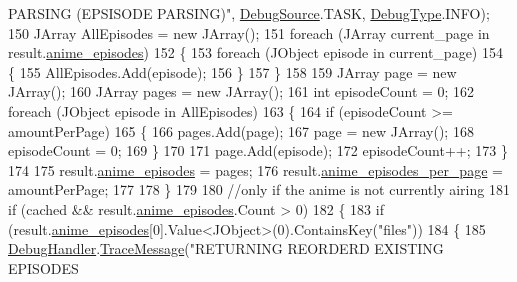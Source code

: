 \begin{DoxyCode}
{       PARSING (EPSISODE PARSING)"}, \mbox{\hyperlink{namespace_little_weeb_library_1_1_handlers_a2a6ca0775121c9c503d58aa254d292be}{DebugSource}}.TASK, \mbox{\hyperlink{namespace_little_weeb_library_1_1_handlers_ab66019ed40462876ec4e61bb3ccb0a62}{DebugType}}.INFO);
150                 JArray AllEpisodes = \textcolor{keyword}{new} JArray();
151                 \textcolor{keywordflow}{foreach} (JArray current\_page \textcolor{keywordflow}{in} result.\mbox{\hyperlink{class_little_weeb_library_1_1_models_1_1_json_kitsu_anime_info_ae788c0962dabe5e210fba53aecae820d}{anime\_episodes}})
152                 \{
153                     \textcolor{keywordflow}{foreach} (JObject episode \textcolor{keywordflow}{in} current\_page)
154                     \{
155                         AllEpisodes.Add(episode);
156                     \}
157                 \}
158 
159                 JArray page = \textcolor{keyword}{new} JArray();
160                 JArray pages = \textcolor{keyword}{new} JArray();
161                 \textcolor{keywordtype}{int} episodeCount = 0;
162                 \textcolor{keywordflow}{foreach} (JObject episode \textcolor{keywordflow}{in} AllEpisodes)
163                 \{
164                     \textcolor{keywordflow}{if} (episodeCount >= amountPerPage)
165                     \{
166                         pages.Add(page);
167                         page = \textcolor{keyword}{new} JArray();
168                         episodeCount = 0;
169                     \}
170 
171                     page.Add(episode);
172                     episodeCount++;
173                 \}
174 
175                 result.\mbox{\hyperlink{class_little_weeb_library_1_1_models_1_1_json_kitsu_anime_info_ae788c0962dabe5e210fba53aecae820d}{anime\_episodes}} = pages;
176                 result.\mbox{\hyperlink{class_little_weeb_library_1_1_models_1_1_json_kitsu_anime_info_a11a2513ce95fe17d206eeb738811d087}{anime\_episodes\_per\_page}} = amountPerPage;
177 
178             \}
179 
180             \textcolor{comment}{//only if the anime is not currently airing}
181             \textcolor{keywordflow}{if} (cached && result.\mbox{\hyperlink{class_little_weeb_library_1_1_models_1_1_json_kitsu_anime_info_ae788c0962dabe5e210fba53aecae820d}{anime\_episodes}}.Count > 0)
182             \{
183                 \textcolor{keywordflow}{if} (result.\mbox{\hyperlink{class_little_weeb_library_1_1_models_1_1_json_kitsu_anime_info_ae788c0962dabe5e210fba53aecae820d}{anime\_episodes}}[0].Value<JObject>(0).ContainsKey(\textcolor{stringliteral}{"files"}))
184                 \{
185                     \mbox{\hyperlink{class_little_weeb_library_1_1_handlers_1_1_anime_profile_handler_a0b0ae3c3838d26351485e6dfc566a632}{DebugHandler}}.\mbox{\hyperlink{interface_little_weeb_library_1_1_handlers_1_1_i_debug_handler_a2e405bc3492e683cd3702fae125221bc}{TraceMessage}}(\textcolor{stringliteral}{"RETURNING REORDERD EXISTING EPISODES
}
\end{DoxyCode}
